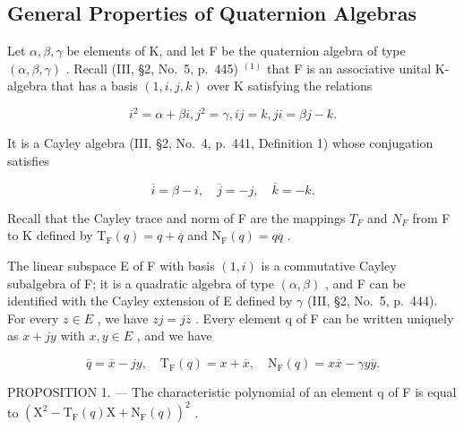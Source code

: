 \subsection{General Properties of Quaternion Algebras}

Let \(\alpha, \beta, \gamma\) be elements of K, and let F be the quaternion algebra of type \((\alpha, \beta, \gamma)\) . Recall (III, §2, No.~5, p.~445) \(^{(1)}\) that F is an associative unital K-algebra that has a basis \((1, i, j, k)\) over K satisfying the relations

\[
i ^ {2} = \alpha + \beta i, j ^ {2} = \gamma , i j = k, j i = \beta j - k.\tag{1}
\]

It is a Cayley algebra (III, §2, No.~4, p.~441, Definition 1) whose conjugation satisfies

\[
\overline {{i}} = \beta - i, \quad \overline {{j}} = - j, \quad \overline {{k}} = - k.\tag{2}
\]

Recall that the Cayley trace and norm of F are the mappings \(T_{F}\) and \(N_{F}\) from F to K defined by \(\mathrm{T}_{\mathrm{F}}(q)=q+\overline{q}\) and \(\mathrm{N}_{\mathrm{F}}(q)=q\overline{q}\) .

The linear subspace E of F with basis \((1,i)\) is a commutative Cayley subalgebra of F; it is a quadratic algebra of type \((\alpha,\beta)\) , and F can be identified with the Cayley extension of E defined by \(\gamma\) (III, §2, No.~5, p.~444). For every \(z\in E\) , we have \(zj=j\overline{z}\) . Every element q of F can be written uniquely as \(x+jy\) with \(x,y\in E\) , and we have

\[
\overline {{q}} = \overline {{x}} - j y, \quad \mathrm{T} _ {\mathrm{F}} (q) = x + \overline {{x}}, \quad \mathrm{N} _ {\mathrm{F}} (q) = x \overline {{x}} - \gamma y \overline {{y}}.\tag{3}
\]

PROPOSITION 1. --- The characteristic polynomial of an element q of F is equal to \(\left(\mathrm{X}^{2}-\mathrm{T}_{\mathrm{F}}(q)\mathrm{X}+\mathrm{N}_{\mathrm{F}}(q)\right)^{2}\) .

